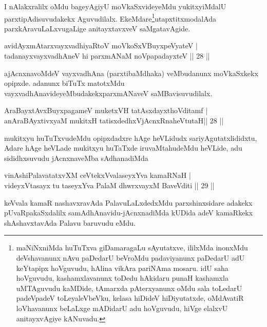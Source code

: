 \begin{artha}
I nAlakxralilx oMdu bageyAgiyU moVkaSxvideyeMdu yukitxyiMdalU parxtipAdisuvudakekx Aguvudilalx. EkeMdare\footnote{maNiNxniMda huTuTxva giDamaragaLu sAyutatxve, ililxMda inonxMdu deVshavanunx nAvu paDedarU beVroMdu padaviyanunx paDedarU adU keYtapipx hoVguvudu, hAlina vikAra pariNAma mosaru. idU saha hoVguvudu, kashamxlavanunx toDedu hAkidaru punaH kashamxla uMTAguvudu kaMDide, tAmarxda pAterxyanunx oMdu sala toLedarU padeVpadeV toLeyaleVbeVku, kelasa hiDideV hiDiyutatxde, oMdAvatiR loVhavanunx beLaLxge mADidarU adu hoVguvudu, hiVge elalxvU anitayxvAgiye kANuvadu.}utapxtitx\break modalAda parxkAravuLaLxvugaLige anitayxtavxveV saMgatavAgide.
\end{artha}

\begin{shl}
avidAyxmAtarxvayxvadhiyaRtoV moVkoSxV\s BuyxpeVyateV |\\
tadanayxvayxvadhAneV hi parxmANaM noVpapadayxteV \hfill || 28 ||
\end{shl}

\begin{artha}
ajAcnxnavoMdeV vayxvadhAna (parxtibaMdhaka) veMbudanunx moVkaSxkekx opipxde. adanunx biTuTx matotxMdu vayxvadhAnavideyeMbudakekx\break parxmANaveV saMBavisuvudilalx.
\end{artha}


\begin{shl}
AraBayxtAvxBuyxpagameV muketxVH tatAsxdayxthoVditamf |\\
anAraBAyxtivxyaM mukitxH tatisxdedhxVjAcnxRnaheVtutaH\hfill || 28 ||
\end{shl}

\begin{artha}
mukitxyu huTuTxvudeMdu opipxdadxre hAge heVLidudx sari\-\break yAgutatxlididxtu, Adare hAge heVLade mukitxyu huTaTxde iruvaMtahudeMdu heVLide, adu sididhxsuvudu jAcnxnaveMba sAdhanadiMda
\end{artha}


\begin{shl}
vinAshiPalavatatxvXM ceVtekxVvalaseyxYva kamaRNaH |\\
videyxVtasayx tu taseyxYva PalaM dhwrxvayxM BaveVditi \hfill || 29 ||
\end{shl}

\begin{artha}
keVvala kamaR nashavxravAda PalavuLaLxdedxMdu parxshinxsidare adakekx pUvaRpakaSxdalilx samAdhAnavidu-jAcnxnadiMda kUDida adeV kamaRkekx shAshavxtavAda Palavu baruvudu eMdu.
\end{artha}

